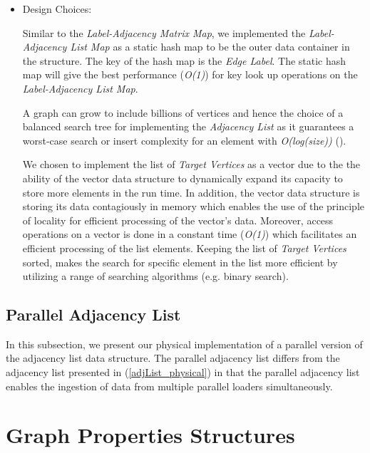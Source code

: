 {\begin{itemize}
By summing up the complexity of the three operations, the overall complexity of searching the structure is \textit{O(1 + log(n) + m)}.

\item{Design Choices:}

Similar to the \textit{Label-Adjacency Matrix Map}, we implemented the \textit{Label-Adjacency List Map} as a static hash map to be the outer data container in the structure. The key of the hash map is the \textit{Edge Label}. The static hash map will give the best performance (\textit{O(1)}) for key look up operations on the \textit{Label-Adjacency List Map}.

A graph can grow to include billions of vertices and hence the choice of a balanced search tree for implementing the \textit{Adjacency List} as it guarantees a worst-case search or insert complexity for an element with \textit{O(log(size))}
(\cite{NSA}).

We chosen to implement the list of \textit{Target Vertices} as a vector due to the the ability of the vector data structure to dynamically expand its capacity to store more elements in the run time. In addition, the vector data structure is storing its data contagiously in memory which enables the use of the principle of locality for efficient processing of the vector's data. Moreover, access operations on a vector is done in a constant time (\textit{O(1)}) which facilitates an efficient processing of the list elements. Keeping the list of \textit{Target Vertices} sorted, makes the search for specific element in the list more efficient by utilizing a range of searching algorithms (e.g. binary search).

\end{itemize}


\subsection{Parallel Adjacency List}

In this subsection, we present our physical implementation of a parallel version of the adjacency list data structure. The parallel adjacency list differs from the adjacency list presented in (\ref{adjList_physical}) in that the parallel adjacency list enables the ingestion of data from multiple parallel loaders simultaneously.



\section{Graph Properties Structures}
\label{GraphPropertiesImp}


}
